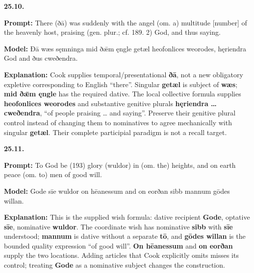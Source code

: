 \par\begin{minipage}{\linewidth}\raggedright
\textbf{25.10.}

\textbf{Prompt:} There (ðā) was suddenly with the angel (om. a) multitude [number] of the heavenly host, praising (gen. plur.; cf. 189. 2) God, and thus saying.

\textbf{Model:} Ðā wæs sęmninga mid ðǣm ęngle getæl heofonlices weorodes, hęriendra God and ðus cweðendra.

\textbf{Explanation:} Cook supplies temporal/\allowbreak{}presentational \textbf{ðā}, not a new obligatory expletive corresponding to English “there”. Singular \textbf{getæl} is subject of \textbf{wæs}; \textbf{mid ðǣm ęngle} has the required dative. The local collective formula supplies \textbf{heofonlices weorodes} and substantive genitive plurals \textbf{hęriendra … cweðendra}, “of people praising … and saying”. Preserve their genitive plural control instead of changing them to nominatives to agree mechanically with singular \textbf{getæl}. Their complete participial paradigm is not a recall target.

\end{minipage}\par\addvspace{4pt}

\par\begin{minipage}{\linewidth}\raggedright
\textbf{25.11.}

\textbf{Prompt:} To God be (193) glory (wuldor) in (om. the) heights, and on earth peace (om. to) men of good will.

\textbf{Model:} Gode sīe wuldor on hēanessum and on eorðan sibb mannum gōdes willan.

\textbf{Explanation:} This is the supplied wish formula: dative recipient \textbf{Gode}, optative \textbf{sīe}, nominative \textbf{wuldor}. The coordinate wish has nominative \textbf{sibb} with \textbf{sīe} understood; \textbf{mannum} is dative without a separate \textbf{tō}, and \textbf{gōdes willan} is the bounded quality expression “of good will”. \textbf{On hēanessum} and \textbf{on eorðan} supply the two locations. Adding articles that Cook explicitly omits misses its control; treating \textbf{Gode} as a nominative subject changes the construction.

\end{minipage}\par\addvspace{4pt}

